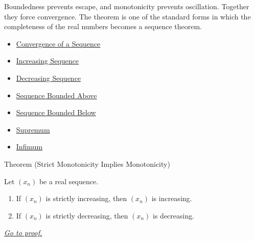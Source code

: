 \begin{remark*}[Interpretation]
Boundedness prevents escape, and monotonicity prevents oscillation. Together
they force convergence. The theorem is one of the standard forms in which the
completeness of the real numbers becomes a sequence theorem.
\end{remark*}

\begin{dependencies}
\begin{itemize}
  \item \hyperref[def:convergent-sequence]{Convergence of a Sequence}
  \item \hyperref[def:increasing-sequence]{Increasing Sequence}
  \item \hyperref[def:decreasing-sequence]{Decreasing Sequence}
  \item \hyperref[def:sequence-bounded-above]{Sequence Bounded Above}
  \item \hyperref[def:sequence-bounded-below]{Sequence Bounded Below}
  \item \hyperref[def:supremum]{Supremum}
  \item \hyperref[def:infimum]{Infimum}
\end{itemize}
\end{dependencies}


\begin{theorembox}{Theorem (Strict Monotonicity Implies Monotonicity)}
\begin{theorem}
\label{thm:strict-monotonicity-implies-monotonicity}
Let $(x_n)$ be a real sequence.
\begin{enumerate}[label=(\alph*)]
  \item If $(x_n)$ is strictly increasing, then $(x_n)$ is increasing.
  \item If $(x_n)$ is strictly decreasing, then $(x_n)$ is decreasing.
\end{enumerate}

\smallskip
\noindent
\hyperref[prf:strict-monotonicity-implies-monotonicity]{\textit{Go to proof.}}
\end{theorem}
\end{theorembox}

